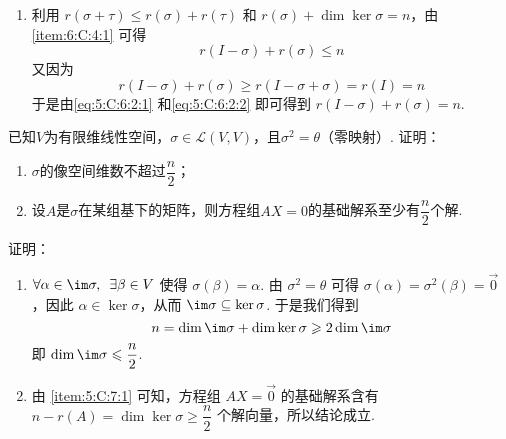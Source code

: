 \begin{exercise}
\begin{exgroup}
\begin{answer}
\begin{enumerate}
                \item 利用 $ r(\sigma + \tau) \leqslant r(\sigma) + r(\tau) $ 和 $ r(\sigma) + \dim \ker \sigma = n $，由 \ref*{item:6:C:4:1} 可得
                      \begin{equation} \label{eq:5:C:6:2:1}
                          r(I - \sigma) + r(\sigma) \leqslant n
                      \end{equation}
                      又因为
                      \begin{equation} \label{eq:5:C:6:2:2}
                          r(I - \sigma) + r(\sigma) \geqslant r(I - \sigma + \sigma) = r(I) = n
                      \end{equation}
                      于是由\autoref{eq:5:C:6:2:1} 和\autoref{eq:5:C:6:2:2} 即可得到 $ r(I - \sigma) + r(\sigma) = n $.
            \end{enumerate}
        \end{answer}


        \item 已知$V$为有限维线性空间，$\sigma\in \mathcal{L}(V,V)$，且$\sigma^2=\theta$（零映射）. 证明：
        \begin{enumerate}
            \item $\sigma$的像空间维数不超过$\dfrac{n}{2}$；

            \item 设$A$是$\sigma$在某组基下的矩阵，则方程组$AX=0$的基础解系至少有$\dfrac{n}{2}$个解.
        \end{enumerate}
        \begin{answer}
            证明：\begin{enumerate}
                \item \label{item:5:C:7:1}
                      $ \forall \alpha \in \im \sigma,\enspace \exists \beta \in V $ 使得 $ \sigma(\beta) = \alpha $. 由 $ \sigma^2 = \theta $ 可得 $ \sigma(\alpha) = \sigma^2(\beta) = \vec{0} $，因此 $ \alpha \in \ker \sigma $，从而 $ \im \sigma \subseteq \ker \sigma $. 于是我们得到
                      \[ n = \dim \im \sigma + \dim \ker \sigma \geqslant 2 \dim \im \sigma \]
                      即 $ \dim \im \sigma \leqslant \dfrac{n}{2} $.

                \item 由 \ref*{item:5:C:7:1} 可知，方程组 $ AX = \vec{0} $ 的基础解系含有 $ n - r(A) = \dim \ker \sigma \geqslant \dfrac{n}{2} $ 个解向量，所以结论成立.
            \end{enumerate}

        \end{answer}
    \end{exgroup}
\end{exercise}
